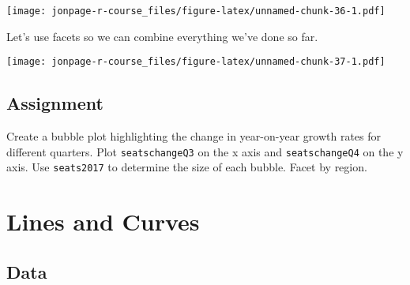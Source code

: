 \documentclass[]{book}
\newenvironment{Shaded}{\begin{snugshade}}{\end{snugshade}}
\newcommand{\KeywordTok}[1]{\textcolor[rgb]{0.13,0.29,0.53}{\textbf{{#1}}}}
\newcommand{\DataTypeTok}[1]{\textcolor[rgb]{0.13,0.29,0.53}{{#1}}}
\newcommand{\DecValTok}[1]{\textcolor[rgb]{0.00,0.00,0.81}{{#1}}}
\newcommand{\FloatTok}[1]{\textcolor[rgb]{0.00,0.00,0.81}{{#1}}}
\newcommand{\StringTok}[1]{\textcolor[rgb]{0.31,0.60,0.02}{{#1}}}
\newcommand{\NormalTok}[1]{{#1}}
\theoremstyle{definition}
\theoremstyle{definition}
\theoremstyle{remark}
\begin{document}
\texttt{[image: jonpage-r-course\_files/figure-latex/unnamed-chunk-36-1.pdf]}

Let's use facets so we can combine everything we've done so far.

\begin{Shaded}
\end{Shaded}

\texttt{[image: jonpage-r-course\_files/figure-latex/unnamed-chunk-37-1.pdf]}

\section{Assignment}\label{assignment-2}

Create a bubble plot highlighting the change in year-on-year growth
rates for different quarters. Plot \texttt{seatschangeQ3} on the x axis
and \texttt{seatschangeQ4} on the y axis. Use \texttt{seats2017} to
determine the size of each bubble. Facet by region.

\chapter{Lines and Curves}\label{lines-and-curves}

\section{Data}\label{data-1}
\end{document}
